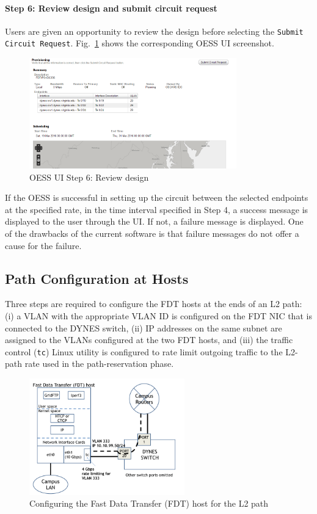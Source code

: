 \paragraph{Step 6: Review design and submit circuit request}
Users are given an opportunity to review the design before selecting
the \texttt{Submit Circuit Request}.
Fig.~\ref{fig:oessreview} shows the corresponding OESS UI screenshot.
\begin{figure}[htb!]
\centering
\includegraphics[width=0.8\textwidth]{figures/oess-review.png}
\caption{OESS UI Step 6: Review design}
\label{fig:oessreview}
\end{figure}

If the OESS is successful in setting up the circuit between the selected endpoints
at the specified rate, in the time interval specified in Step 4, a success message
is displayed to the user through the UI. If not, a failure message is displayed.
One of the drawbacks of the current software is that failure messages do
not offer a cause for the failure.

\subsection{Path Configuration at Hosts}
\label{sec:multidomain-SDN-FDT-access}
Three steps are required to configure the FDT hosts at the
ends of an L2 path: (i) a VLAN with the appropriate VLAN
ID is configured on the FDT NIC that is connected to the
DYNES switch, (ii) IP addresses on the same subnet are
assigned to the VLANs configured at the two FDT hosts,
and (iii) the traffic control (\texttt{tc}) Linux utility is configured
to rate limit outgoing traffic to the L2-path rate used in the
path-reservation phase.
\begin{figure}
\centering
\includegraphics[width=0.6\textwidth]{figures/uvadynes.png}
\caption{Configuring the Fast Data Transfer (FDT) host for the L2 path}
\label{fig:uvadynes}
\end{figure}


